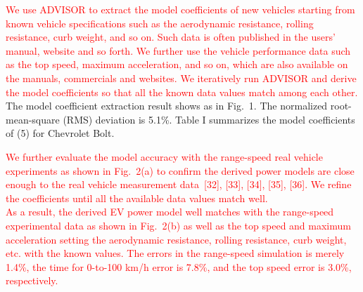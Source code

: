 \documentclass[onecolumn]{IEEEconf}
\begin{document}
\begin{description}
\textcolor{red}{We use ADVISOR to extract the model coefficients of new vehicles starting from known vehicle specifications such as the aerodynamic resistance, rolling resistance, curb weight, and so on. Such data is often published in the users' manual, website and so forth. We further use the vehicle performance data such as the top speed, maximum acceleration, and so on, which are also available on the manuals, commercials and websites. We iteratively run ADVISOR and derive the model coefficients so that all the known data values match among each other.} The model coefficient extraction result shows as in Fig.~1. The normalized root-mean-square (RMS) deviation is 5.1\%. Table I summarizes the model coefficients of (5) for Chevrolet Bolt.

\textcolor{red}{We further evaluate the model accuracy with the range-speed real vehicle experiments as shown in Fig.~2(a) to confirm the derived power models are close enough to the real vehicle measurement data~[32], [33], [34], [35], [36]. We  refine the coefficients until all the available data values match well. \\
As a result, the derived EV power model well matches with the range-speed experimental data as shown in Fig.~2(b) as well as the top speed and maximum acceleration setting the aerodynamic resistance, rolling resistance, curb weight, etc. with the known values. The errors in the range-speed simulation is merely 1.4\%, the time for 0-to-100 km/h error is 7.8\%, and the top speed error is 3.0\%, respectively.} 



\end{description}
\end{document}
